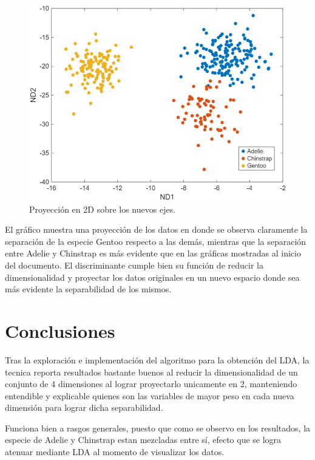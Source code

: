 \documentclass[11pt, letterpaper]{article}
\begin{document}
\begin{figure}[h!]
	\centering
	\begin{minipage}{1.1\textwidth}
		\centering
		\includegraphics[width=\textwidth]{IMG/G6.png}
		\caption{Proyección en 2D sobre los nuevos ejes.}
		\label{fig:f7}
	\end{minipage}\hfill
\end{figure}

El gráfico muestra una proyección de los datos en donde se observa claramente la separación de la especie Gentoo respecto a las demás, mientras que la separación entre Adelie y Chinstrap es más evidente que en las gráficas mostradas al inicio del documento. El discriminante cumple bien su función de reducir la dimensionalidad y proyectar los datos originales en un nuevo espacio donde sea más evidente la separabilidad de los mismos.


\newpage
	
\section{Conclusiones}
	
Tras la exploración e implementación del algoritmo para la obtención del LDA, la tecnica reporta resultados bastante buenos al reducir la dimensionalidad de un conjunto de 4 dimensiones al lograr proyectarlo unicamente en 2, manteniendo entendible y explicable quienes son las variables de mayor peso en cada nueva dimensión para lograr dicha separabilidad.

Funciona bien a rasgos generales, puesto que como se observo en los resultados, la especie de Adelie y Chinstrap estan mezcladas entre sí, efecto que se logra atenuar mediante LDA al momento de visualizar los datos.
\end{document}
